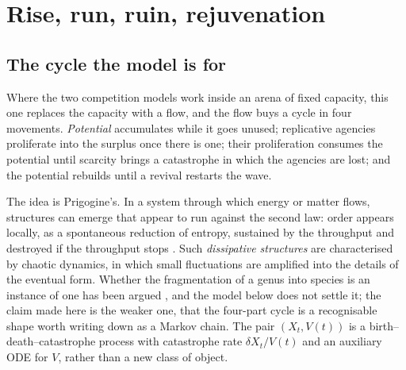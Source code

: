 
\section{Rise, run, ruin, rejuvenation}
\label{var:sec:rrrr}

\subsection{The cycle the model is for}
\label{var:sec:rrrrmotivation}

Where the two competition models work inside an arena of fixed capacity, this
one replaces the capacity with a flow, and the flow buys a cycle in four
movements. \emph{Potential} accumulates while it goes unused; replicative
agencies proliferate into the surplus once there is one; their proliferation
consumes the potential until scarcity brings a catastrophe in which the
agencies are lost; and the potential rebuilds until a revival restarts the
wave.

The idea is Prigogine's. In a system through which energy or matter flows,
structures can emerge that appear to run against the second
law: order appears locally, as a spontaneous reduction of entropy, sustained
by the throughput and destroyed if the throughput stops
\cite{prigogine2018order}. Such \emph{dissipative structures} are
characterised by chaotic dynamics, in which small fluctuations are amplified
into the details of the eventual form. Whether the fragmentation of a genus
into species is an instance of one has been argued
\cite{elitzur1994let,sharma2023assembly}, and the model below does not settle
it; the claim made here is the weaker one, that the four-part cycle is a
recognisable shape worth writing down as a Markov chain. The pair $(X_t,V(t))$ is a birth--death--catastrophe process with
catastrophe rate $\delta X_t/V(t)$ and an auxiliary ODE for $V$, rather than
a new class of object.

